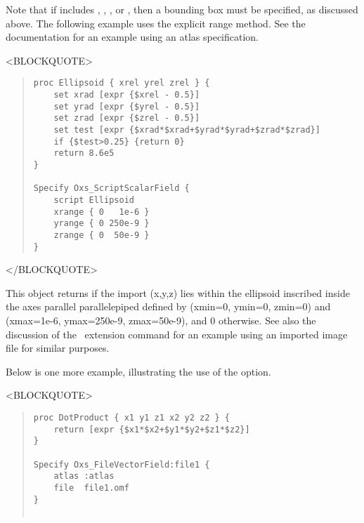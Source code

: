 \begin{description}
   Note that if  includes , ,
   , or , then a bounding box must be specified, as
   discussed above.  The following example uses the explicit range
   method.  See the 
   documentation
   for an example using an atlas specification.
\begin{rawhtml}
<BLOCKQUOTE>
\end{rawhtml}
\begin{quote}
\begin{verbatim}
proc Ellipsoid { xrel yrel zrel } {
    set xrad [expr {$xrel - 0.5}]
    set yrad [expr {$yrel - 0.5}]
    set zrad [expr {$zrel - 0.5}]
    set test [expr {$xrad*$xrad+$yrad*$yrad+$zrad*$zrad}]
    if {$test>0.25} {return 0}
    return 8.6e5
}

Specify Oxs_ScriptScalarField {
    script Ellipsoid
    xrange { 0   1e-6 }
    yrange { 0 250e-9 }
    zrange { 0  50e-9 }
}
\end{verbatim}
\end{quote}
\begin{rawhtml}
</BLOCKQUOTE>
\end{rawhtml}
   This  object returns  if the import (x,y,z) lies within the ellipsoid
   inscribed inside the axes parallel parallelepiped defined by (xmin=0,
   ymin=0, zmin=0) and (xmax=1e-6, ymax=250e-9, zmax=50e-9), and 0
   otherwise.
   See also the discussion of the
    \MIF\ extension command
    for an example using
   an imported image file for similar purposes.

   Below is one more example, illustrating the use of the
    option.
\begin{rawhtml}
<BLOCKQUOTE>
\end{rawhtml}
\begin{quote}
\begin{verbatim}
proc DotProduct { x1 y1 z1 x2 y2 z2 } {
    return [expr {$x1*$x2+$y1*$y2+$z1*$z2}]
}

Specify Oxs_FileVectorField:file1 {
    atlas :atlas
    file  file1.omf
}


\end{verbatim}
\end{quote}
\end{description}
